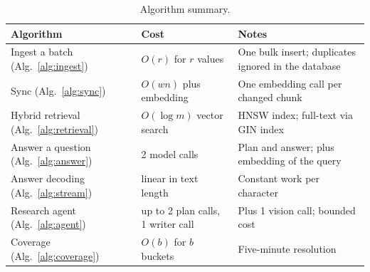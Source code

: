 \begin{table}[H]
\centering
\caption{Algorithm summary.}
\label{tab:algsummary}
\small
\begin{tabular}{|P{4.0cm}|P{2.4cm}|P{6.4cm}|}
\hline
\textbf{Algorithm} & \textbf{Cost} & \textbf{Notes}\\\hline
Ingest a batch (Alg.~\ref{alg:ingest}) & $O(r)$ for $r$ values & One bulk insert; duplicates ignored in the database\\\hline
Sync (Alg.~\ref{alg:sync}) & $O(wn)$ plus embedding & One embedding call per changed chunk\\\hline
Hybrid retrieval (Alg.~\ref{alg:retrieval}) & $O(\log m)$ vector search & HNSW index; full-text via GIN index\\\hline
Answer a question (Alg.~\ref{alg:answer}) & 2 model calls & Plan and answer; plus embedding of the query\\\hline
Answer decoding (Alg.~\ref{alg:stream}) & linear in text length & Constant work per character\\\hline
Research agent (Alg.~\ref{alg:agent}) & up to 2 plan calls, 1 writer call & Plus 1 vision call; bounded cost\\\hline
Coverage (Alg.~\ref{alg:coverage}) & $O(b)$ for $b$ buckets & Five-minute resolution\\\hline
\end{tabular}
\end{table}
